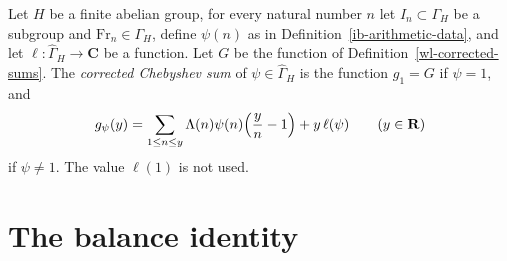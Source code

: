 \begin{definition}\label{ib-host-chebyshev}
Let $H$ be a finite abelian group, for every natural number $n$ let
$I_n\subset\Gamma_H$ be a subgroup and $\mathrm{Fr}_n\in\Gamma_H$, define
$\psi(n)$ as in Definition~\ref{ib-arithmetic-data}, and let
$\ell:\widehat\Gamma_H\to\mathbf C$ be a function. Let $G$ be the function of
Definition~\ref{wl-corrected-sums}. The \emph{corrected Chebyshev sum} of
$\psi\in\widehat\Gamma_H$ is the function $g_1=G$ if $\psi=1$, and
\[
 g_\psi(y)=\sum_{1\leq n\leq y}\Lambda(n)\psi(n)\Bigl(\frac yn-1\Bigr)+y\,\ell(\psi)
 \qquad(y\in\mathbf R)
\]
if $\psi\neq1$. The value $\ell(1)$ is not used.
\end{definition}

\section{The balance identity}\label{section-ib-balance}

